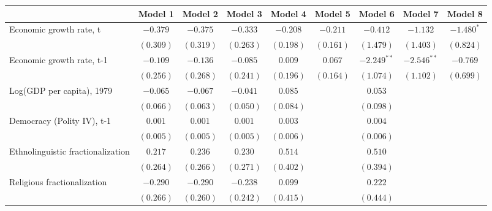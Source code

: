 
\begin{table}
\begin{center}
\begin{tabular}{l c c c c c c c c}
\hline
 & Model 1 & Model 2 & Model 3 & Model 4 & Model 5 & Model 6 & Model 7 & Model 8 \\
\hline
Economic growth rate, t           & $-0.379$    & $-0.375$    & $-0.333$    & $-0.208$     & $-0.211$  & $-0.412$      & $-1.132$      & $-1.480^{*}$ \\
                                  & $(0.309)$   & $(0.319)$   & $(0.263)$   & $(0.198)$    & $(0.161)$ & $(1.479)$     & $(1.403)$     & $(0.824)$    \\
Economic growth rate, t-1         & $-0.109$    & $-0.136$    & $-0.085$    & $0.009$      & $0.067$   & $-2.249^{**}$ & $-2.546^{**}$ & $-0.769$     \\
                                  & $(0.256)$   & $(0.268)$   & $(0.241)$   & $(0.196)$    & $(0.164)$ & $(1.074)$     & $(1.102)$     & $(0.699)$    \\
Log(GDP per capita), 1979         & $-0.065$    & $-0.067$    & $-0.041$    & $0.085$      &           & $0.053$       &               &              \\
                                  & $(0.066)$   & $(0.063)$   & $(0.050)$   & $(0.084)$    &           & $(0.098)$     &               &              \\
Democracy (Polity IV), t-1        & $0.001$     & $0.001$     & $0.001$     & $0.003$      &           & $0.004$       &               &              \\
                                  & $(0.005)$   & $(0.005)$   & $(0.005)$   & $(0.006)$    &           & $(0.006)$     &               &              \\
Ethnolinguistic fractionalization & $0.217$     & $0.236$     & $0.230$     & $0.514$      &           & $0.510$       &               &              \\
                                  & $(0.264)$   & $(0.266)$   & $(0.271)$   & $(0.402)$    &           & $(0.394)$     &               &              \\
Religious fractionalization       & $-0.290$    & $-0.290$    & $-0.238$    & $0.099$      &           & $0.222$       &               &              \\
                                  & $(0.266)$   & $(0.260)$   & $(0.242)$   & $(0.415)$    &           & $(0.444)$     &               &              \\

\end{tabular}
\end{center}
\end{table}
